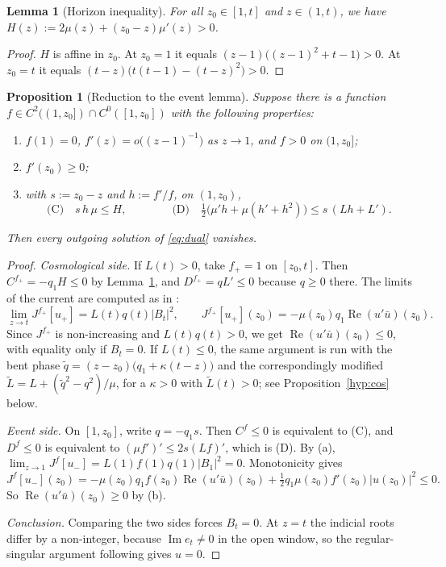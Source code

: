 \documentclass[11pt]{amsart}
\newtheorem{proposition}[theorem]{Proposition}
\newtheorem{lemma}[theorem]{Lemma}
\theoremstyle{definition}
\theoremstyle{remark}
\numberwithin{equation}{section}
\renewcommand{\Im}{\operatorname{Im}}
\renewcommand{\Re}{\operatorname{Re}}
\begin{document}
\begin{lemma}[Horizon inequality]\label{lem:H}
For all $z_0\in[1,t]$ and $z\in(1,t)$, we have $H(z):=2\mu(z)+(z_0-z)\mu'(z)>0$.
\end{lemma}
\begin{proof}
$H$ is affine in $z_0$. At $z_0=1$ it equals $(z-1)\big((z-1)^2+t-1\big)>0$. At $z_0=t$ it equals
$(t-z)\big(t(t-1)-(t-z)^2\big)>0$.
\end{proof}

\begin{proposition}[Reduction to the event lemma]\label{prop:reduction}
Suppose there is a function $f\in C^2((1,z_0])\cap C^0([1,z_0])$ with the following properties:
\begin{enumerate}[label=(\alph*)]
\item $f(1)=0$, $f'(z)=o\big((z-1)^{-1}\big)$ as $z\to1$, and $f>0$ on $(1,z_0]$;
\item $f'(z_0)\ge0$;
\item with $s:=z_0-z$ and $h:=f'/f$, on $(1,z_0)$,
\begin{equation}\label{eq:CD}
\text{(C)}\quad s\,h\,\mu\le H,\qquad\qquad \text{(D)}\quad \tfrac12\big(\mu'h+\mu(h'+h^2)\big)\le s\,(Lh+L').
\end{equation}
\end{enumerate}
Then every outgoing solution of \eqref{eq:dual} vanishes.
\end{proposition}

\begin{proof}
\emph{Cosmological side.} If $L(t)>0$, take $f_+=1$ on $[z_0,t]$. Then $C^{f_+}=-q_1H\le0$ by Lemma~\ref{lem:H}, and
$D^{f_+}=qL'\le0$ because $q\ge0$ there. The limits of the current are computed as in \cite[Lemma~4.2]{Hin26}:
\[
\lim_{z\to t}J^{f_+}[u_+]=L(t)q(t)|B_t|^2,\qquad J^{f_+}[u_+](z_0)=-\mu(z_0)q_1\Re(u'\bar u)(z_0).
\]
Since $J^{f_+}$ is non-increasing and $L(t)q(t)>0$, we get $\Re(u'\bar u)(z_0)\le0$, with
equality only if $B_t=0$. If $L(t)\le0$, the same argument is run with the bent phase $\tilde q=(z-z_0)\big(q_1+\kappa(t-z)\big)$
and the correspondingly modified $\tilde L=L+(\tilde q^2-q^2)/\mu$, for a $\kappa>0$ with $\tilde L(t)>0$; see
Proposition~\ref{hyp:cos} below.

\emph{Event side.} On $[1,z_0]$, write $q=-q_1s$. Then $C^f\le0$ is equivalent to (C), and $D^f\le0$ is equivalent to
$(\mu f')'\le2s(Lf)'$, which is (D). By (a), $\lim_{z\to1}J^f[u_-]=L(1)f(1)q(1)|B_1|^2=0$. Monotonicity gives
\[
J^f[u_-](z_0)=-\mu(z_0)q_1f(z_0)\Re(u'\bar u)(z_0)+\tfrac12q_1\mu(z_0)f'(z_0)|u(z_0)|^2\le0.
\]
So $\Re(u'\bar u)(z_0)\ge0$ by (b).

\emph{Conclusion.} Comparing the two sides forces $B_t=0$. At $z=t$ the indicial roots differ by a non-integer,
because $\Im e_t\ne0$ in the open window, so the regular-singular argument following \cite[(3.6)]{Hin26} gives
$u=0$.
\end{proof}
\end{document}
